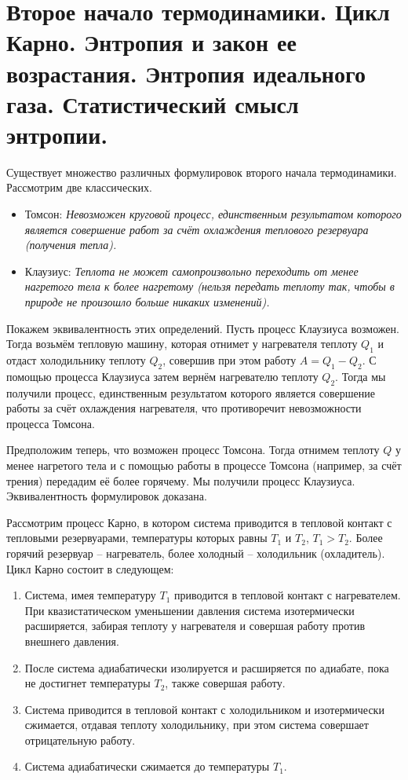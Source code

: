 \section{Второе начало термодинамики. Цикл Карно. Энтропия и закон ее возрастания. Энтропия идеального газа. Статистический смысл энтропии.}

Существует множество различных формулировок второго начала термодинамики. Рассмотрим две классических.

\begin{itemize}
    \item Томсон: \textit{Невозможен круговой процесс, единственным результатом которого является совершение работ за счёт охлаждения теплового резервуара (получения тепла).}
    \item Клаузиус: \textit{Теплота не может самопроизвольно переходить от менее нагретого тела к более нагретому (нельзя передать теплоту так, чтобы в природе не произошло больше никаких изменений).}
\end{itemize}

Покажем эквивалентность этих определений. Пусть процесс Клаузиуса возможен. Тогда возьмём тепловую машину, которая отнимет у нагревателя теплоту $Q_1$ и отдаст холодильнику теплоту $Q_2$, совершив при этом работу $A = Q_1 - Q_2$. С помощью процесса Клаузиуса затем вернём нагревателю теплоту $Q_2$. Тогда мы получили процесс, единственным результатом которого является совершение работы за счёт охлаждения нагревателя, что противоречит невозможности процесса Томсона.

Предположим теперь, что возможен процесс Томсона. Тогда отнимем теплоту $Q$ у менее нагретого тела и с помощью работы в процессе Томсона (например, за счёт трения) передадим её более горячему. Мы получили процесс Клаузиуса. Эквивалентность формулировок доказана.

Рассмотрим процесс Карно, в котором система приводится в тепловой контакт с тепловыми резервуарами, температуры которых равны $T_1$ и $T_2$, $T_1 > T_2$. Более горячий резервуар -- нагреватель, более холодный -- холодильник (охладитель). Цикл Карно состоит в следующем:

\begin{enumerate}
    \item Система, имея температуру $T_1$ приводится в тепловой контакт с нагревателем. При квазистатическом уменьшении давления система изотермически расширяется, забирая теплоту у нагревателя и совершая работу против внешнего давления.
    \item После система адиабатически изолируется и расширяется по адиабате, пока не достигнет температуры $T_2$, также совершая работу.
    \item Система приводится в тепловой контакт с холодильником и изотермически сжимается, отдавая теплоту холодильнику, при этом система совершает отрицательную работу.
    \item Система адиабатически сжимается до температуры $T_1$.
\end{enumerate}

